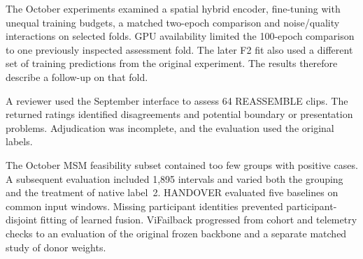 The October experiments examined a spatial hybrid encoder, fine-tuning with unequal training budgets, a matched two-epoch comparison and noise/quality interactions on selected folds. GPU availability limited the 100-epoch comparison to one previously inspected assessment fold. The later F2 fit also used a different set of training predictions from the original experiment. The results therefore describe a follow-up on that fold.

A reviewer used the September interface to assess 64 REASSEMBLE clips. The returned ratings identified disagreements and potential boundary or presentation problems. Adjudication was incomplete, and the evaluation used the original labels.

The October MSM feasibility subset contained too few groups with positive cases. A subsequent evaluation included 1,895 intervals and varied both the grouping and the treatment of native label~2. HANDOVER evaluated five baselines on common input windows. Missing participant identities prevented participant-disjoint fitting of learned fusion. ViFailback progressed from cohort and telemetry checks to an evaluation of the original frozen backbone and a separate matched study of donor weights.

